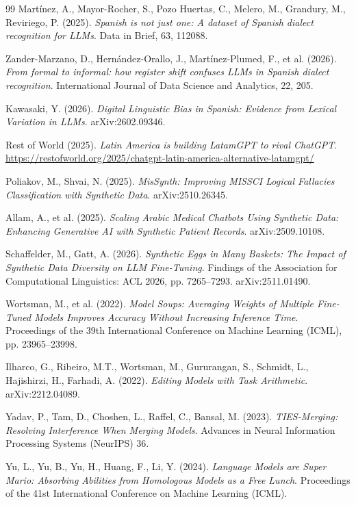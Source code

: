 \documentclass[11pt,a4paper]{article}
\begin{document}
\begin{thebibliography}{99}
 Martínez, A., Mayor-Rocher, S., Pozo Huertas, C., Melero, M., Grandury, M., Reviriego, P. (2025). \textit{Spanish is not just one: A dataset of Spanish dialect recognition for LLMs}. Data in Brief, 63, 112088.

 Zander-Marzano, D., Hernández-Orallo, J., Martínez-Plumed, F., et al. (2026). \textit{From formal to informal: how register shift confuses LLMs in Spanish dialect recognition}. International Journal of Data Science and Analytics, 22, 205.

 Kawasaki, Y. (2026). \textit{Digital Linguistic Bias in Spanish: Evidence from Lexical Variation in LLMs}. arXiv:2602.09346.

 Rest of World (2025). \textit{Latin America is building LatamGPT to rival ChatGPT}. \url{https://restofworld.org/2025/chatgpt-latin-america-alternative-latamgpt/}

 Poliakov, M., Shvai, N. (2025). \textit{MisSynth: Improving MISSCI Logical Fallacies Classification with Synthetic Data}. arXiv:2510.26345.

 Allam, A., et al. (2025). \textit{Scaling Arabic Medical Chatbots Using Synthetic Data: Enhancing Generative AI with Synthetic Patient Records}. arXiv:2509.10108.

 Schaffelder, M., Gatt, A. (2026). \textit{Synthetic Eggs in Many Baskets: The Impact of Synthetic Data Diversity on LLM Fine-Tuning}. Findings of the Association for Computational Linguistics: ACL 2026, pp. 7265--7293. arXiv:2511.01490.

 Wortsman, M., et al. (2022). \textit{Model Soups: Averaging Weights of Multiple Fine-Tuned Models Improves Accuracy Without Increasing Inference Time}. Proceedings of the 39th International Conference on Machine Learning (ICML), pp. 23965--23998.

 Ilharco, G., Ribeiro, M.T., Wortsman, M., Gururangan, S., Schmidt, L., Hajishirzi, H., Farhadi, A. (2022). \textit{Editing Models with Task Arithmetic}. arXiv:2212.04089.

 Yadav, P., Tam, D., Choshen, L., Raffel, C., Bansal, M. (2023). \textit{TIES-Merging: Resolving Interference When Merging Models}. Advances in Neural Information Processing Systems (NeurIPS) 36.

 Yu, L., Yu, B., Yu, H., Huang, F., Li, Y. (2024). \textit{Language Models are Super Mario: Absorbing Abilities from Homologous Models as a Free Lunch}. Proceedings of the 41st International Conference on Machine Learning (ICML).


\end{thebibliography}
\end{document}
